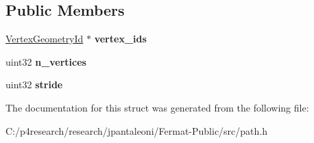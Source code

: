 \subsection*{Public Members}
\begin{DoxyCompactItemize}
\item 
\mbox{\label{struct_path_a78555e28d407d5f9a7b357de09672177}} 
\hyperlink{struct_vertex_geometry_id}{Vertex\+Geometry\+Id} $\ast$ {\bfseries vertex\+\_\+ids}
\item 
\mbox{\label{struct_path_a378f7d2cd404c20660058b9f9996814b}} 
uint32 {\bfseries n\+\_\+vertices}
\item 
\mbox{\label{struct_path_adf70bfe5101af8293b27fc4b43c490a2}} 
uint32 {\bfseries stride}
\end{DoxyCompactItemize}


The documentation for this struct was generated from the following file\+:\begin{DoxyCompactItemize}
\item 
C\+:/p4research/research/jpantaleoni/\+Fermat-\/\+Public/src/path.\+h\end{DoxyCompactItemize}
